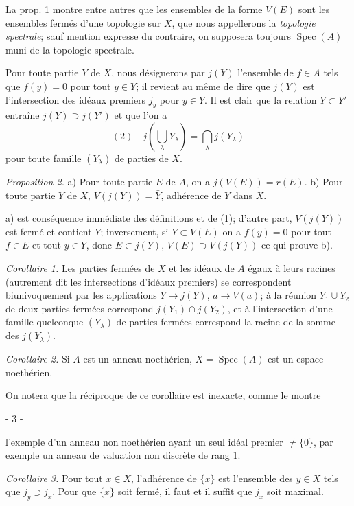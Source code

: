 La prop. 1 montre entre autres que les ensembles de la forme $V(E)$ sont les ensembles fermés d'une topologie sur $X$, que nous appellerons la \emph{topologie spectrale}; sauf mention expresse du contraire, on supposera toujours $\operatorname{Spec}(A)$ muni de la topologie spectrale.

Pour toute partie $Y$ de $X$, nous désignerons par $j(Y)$ l'ensemble de $f \in A$ tels que $f(y) = 0$ pour tout $y \in Y$; il revient au même de dire que $j(Y)$ est l'intersection des idéaux premiers $j_y$ pour $y \in Y$. Il est clair que la relation $Y \subset Y'$ entraîne $j(Y) \supset j(Y')$ et que l'on a
$$(2) \quad j(\bigcup_\lambda Y_\lambda) = \bigcap_\lambda j(Y_\lambda)$$
pour toute famille $(Y_\lambda)$ de parties de $X$.

\emph{Proposition 2.} a) Pour toute partie $E$ de $A$, on a $j(V(E)) = r(E)$.
b) Pour toute partie $Y$ de $X$, $V(j(Y)) = \bar{Y}$, adhérence de $Y$ dans $X$.

a) est conséquence immédiate des définitions et de (1); d'autre part, $V(j(Y))$ est fermé et contient $Y$; inversement, si $Y \subset V(E)$ on a $f(y) = 0$ pour tout $f \in E$ et tout $y \in Y$, donc $E \subset j(Y)$, $V(E) \supset V(j(Y))$ ce qui prouve b).

\emph{Corollaire 1.} Les parties fermées de $X$ et les idéaux de $A$ égaux à leurs racines (autrement dit les intersections d'idéaux premiers) se correspondent biunivoquement par les applications $Y \to j(Y)$, $a \to V(a)$; à la réunion $Y_1 \cup Y_2$ de deux parties fermées correspond $j(Y_1) \cap j(Y_2)$, et à l'intersection d'une famille quelconque $(Y_\lambda)$ de parties fermées correspond la racine de la somme des $j(Y_\lambda)$.

\emph{Corollaire 2.} Si $A$ est un anneau noethérien, $X = \operatorname{Spec}(A)$ est un espace noethérien.

On notera que la réciproque de ce corollaire est inexacte, comme le montre

\newpage


- 3 -

l'exemple d'un anneau non noethérien ayant un seul idéal premier $\neq \{0\}$, par exemple un anneau de valuation non discrète de rang 1.

\emph{Corollaire 3.} Pour tout $x \in X$, l'adhérence de $\{x\}$ est l'ensemble des $y \in X$ tels que $j_y \supset j_x$. Pour que $\{x\}$ soit fermé, il faut et il suffit que $j_x$ soit maximal.

